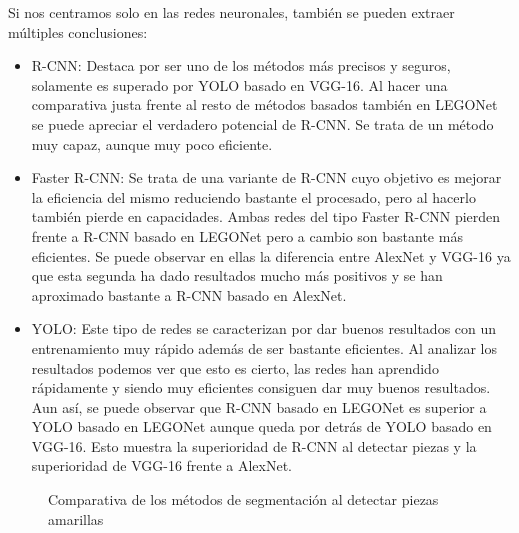 Si nos centramos solo en las redes neuronales, también se pueden extraer múltiples conclusiones:
\begin{itemize}
\item R-CNN: Destaca por ser uno de los métodos más precisos y seguros, solamente es superado por YOLO basado en VGG-16. Al hacer una comparativa justa frente al resto de métodos basados también en LEGONet se puede apreciar el verdadero potencial de R-CNN. Se trata de un método muy capaz, aunque muy poco eficiente.
\item Faster R-CNN: Se trata de una variante de R-CNN cuyo objetivo es mejorar la eficiencia del mismo reduciendo bastante el procesado, pero al hacerlo también pierde en capacidades. Ambas redes del tipo Faster R-CNN pierden frente a R-CNN basado en LEGONet pero a cambio son bastante más eficientes. Se puede observar en ellas la diferencia entre AlexNet y VGG-16 ya que esta segunda ha dado resultados mucho más positivos y se han aproximado bastante a R-CNN basado en AlexNet.
\item YOLO: Este tipo de redes se caracterizan por dar buenos resultados con un entrenamiento muy rápido además de ser bastante eficientes. Al analizar los resultados podemos ver que esto es cierto, las redes han aprendido rápidamente y siendo muy eficientes consiguen dar muy buenos resultados. Aun así, se puede observar que R-CNN basado en LEGONet es superior a YOLO basado en LEGONet aunque queda por detrás de YOLO basado en VGG-16. Esto muestra la superioridad de R-CNN al detectar piezas y la superioridad de VGG-16 frente a AlexNet.
\end{itemize}


\begin{figure}[ht]  %
\vspace{-30pt}
  \hfill	
\caption{Comparativa de los métodos de segmentación al detectar piezas amarillas}
\label{fig:yellow resultados}
\vspace{-5pt}
\end{figure}

